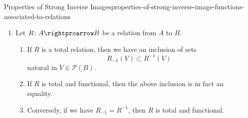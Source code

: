 \begin{proposition}{Properties of Strong Inverse Images}{properties-of-strong-inverse-image-functions-associated-to-relations}
\begin{enumerate}
\[                R_{-1}(V)%
                =%
                A\setminus R^{-1}(B\setminus V)
            \]%
            for each $V\in\mathcal{P}(B)$.
        \item\label{properties-of-strong-inverse-image-functions-associated-to-relations-interaction-with-weak-inverse-images-2}Let $R\colon A\rightproarrow B$ be a relation from $A$ to $B$.
            \begin{enumerate}
                \item\label{properties-of-strong-inverse-image-functions-associated-to-relations-interaction-with-weak-inverse-images-2-a}If $R$ is a total relation, then we have an inclusion of sets
                    \[
                        R_{-1}(V)
                        \subset
                        R^{-1}(V)
                    \]%
                    natural in $V\in\mathcal{P}(B)$.
                \item\label{properties-of-strong-inverse-image-functions-associated-to-relations-interaction-with-weak-inverse-images-2-b}If $R$ is total and functional, then the above inclusion is in fact an equality.
                \item\label{properties-of-strong-inverse-image-functions-associated-to-relations-interaction-with-weak-inverse-images-2-c}Conversely, if we have $R_{-1}=R^{-1}$, then $R$ is total and functional.
            \end{enumerate}
    \end{enumerate}
\end{proposition}
